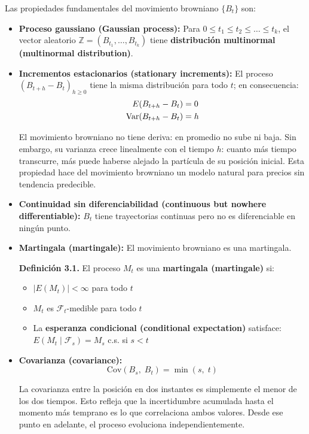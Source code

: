 \documentclass[12pt]{article}
\begin{document}
Las propiedades fundamentales del movimiento browniano $\{B_t\}$ son:

\begin{itemize}
  \item \textbf{Proceso gaussiano (Gaussian process):} Para $0 \leq t_1 \leq t_2 \leq \ldots \leq t_k$, el vector aleatorio $\mathbb{Z} = (B_{t_1}, \ldots, B_{t_k})$ tiene \textbf{distribuci\'on multinormal (multinormal distribution)}.

  \item \textbf{Incrementos estacionarios (stationary increments):} El proceso $(B_{t+h} - B_t)_{h \geq 0}$ tiene la misma distribuci\'on para todo $t$; en consecuencia:
  \begin{align}
    E(B_{t+h} - B_t) &= 0 \notag\\
    \mathrm{Var}(B_{t+h} - B_t) &= h
  \end{align}

  \begin{intuicionmat}
  El movimiento browniano no tiene deriva: en promedio no sube ni baja. Sin embargo, su varianza crece linealmente con el tiempo $h$: cuanto m\'as tiempo transcurre, m\'as puede haberse alejado la part\'icula de su posici\'on inicial. Esta propiedad hace del movimiento browniano un modelo natural para precios sin tendencia predecible.
  \end{intuicionmat}

  \item \textbf{Continuidad sin diferenciabilidad (continuous but nowhere differentiable):} $B_t$ tiene trayectorias continuas pero no es diferenciable en ning\'un punto.

  \item \textbf{Martingala (martingale):} El movimiento browniano es una martingala.

  \textbf{Definici\'on 3.1.} El proceso $M_t$ es una \textbf{martingala (martingale)} si:
  \begin{itemize}
    \item $|E(M_t)| < \infty$ para todo $t$
    \item $M_t$ es $\mathcal{F}_t$-medible para todo $t$
    \item La \textbf{esperanza condicional (conditional expectation)} satisface: $E(M_t \mid \mathcal{F}_s) = M_s$ c.s. si $s < t$
  \end{itemize}

  \item \textbf{Covarianza (covariance):}
  \begin{equation}
    \mathrm{Cov}(B_s,\; B_t) = \min(s,\; t)
  \end{equation}

  \begin{intuicionmat}
  La covarianza entre la posici\'on en dos instantes es simplemente el menor de los dos tiempos. Esto refleja que la incertidumbre acumulada hasta el momento m\'as temprano es lo que correlaciona ambos valores. Desde ese punto en adelante, el proceso evoluciona independientemente.
  \end{intuicionmat}
\end{itemize}
\end{document}
